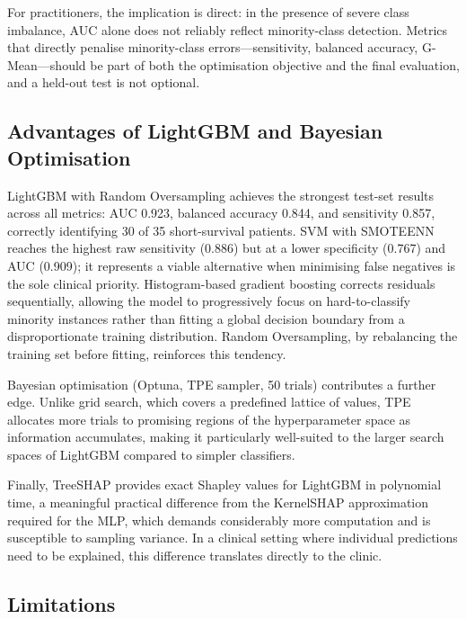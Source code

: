 \documentclass[a4paper,twoside]{article}
\begin{document}
For practitioners, the implication is direct: in the presence of severe class
imbalance, AUC alone does not reliably reflect minority-class detection.
Metrics that directly penalise minority-class errors---sensitivity, balanced
accuracy, G-Mean---should be part of both the optimisation objective and the
final evaluation, and a held-out test is not optional.

\subsection{Advantages of LightGBM and Bayesian Optimisation}

LightGBM with Random Oversampling achieves the strongest test-set results across
all metrics: AUC 0.923, balanced accuracy 0.844, and sensitivity 0.857, correctly
identifying 30 of 35 short-survival patients. SVM with SMOTEENN reaches the
highest raw sensitivity (0.886) but at a lower specificity (0.767) and AUC
(0.909); it represents a viable alternative when minimising false negatives is
the sole clinical priority. Histogram-based gradient boosting corrects residuals
sequentially, allowing the model to progressively focus on hard-to-classify
minority instances rather than fitting a global decision boundary from a
disproportionate training distribution. Random Oversampling, by rebalancing the
training set before fitting, reinforces this tendency.

Bayesian optimisation (Optuna, TPE sampler, 50 trials) contributes a further edge. Unlike grid search, which covers a predefined lattice of values, TPE allocates
more trials to promising regions of the hyperparameter space as information
accumulates, making it particularly well-suited to the larger search spaces of
LightGBM compared to simpler classifiers.

Finally, TreeSHAP provides exact Shapley values for LightGBM in polynomial
time, a meaningful practical difference from the KernelSHAP approximation
required for the MLP, which demands considerably more computation and is
susceptible to sampling variance. In a clinical setting where individual
predictions need to be explained, this difference translates directly to the clinic.

\subsection{Limitations}
\end{document}
